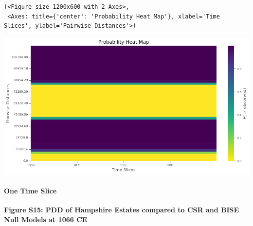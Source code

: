 \documentclass[
  11pt,
  letterpaper,
  DIV=11,
  numbers=noendperiod]{scrartcl}
\let\oldparagraph\paragraph
\renewcommand{\paragraph}[1]{\oldparagraph{#1}\mbox{}}
\begin{document}
\begin{verbatim}
(<Figure size 1200x600 with 2 Axes>,
 <Axes: title={'center': 'Probability Heat Map'}, xlabel='Time Slices', ylabel='Pairwise Distances'>)
\end{verbatim}

\includegraphics{analysis_files/figure-pdf/cell-29-output-2.png}

\paragraph{One Time Slice}\label{one-time-slice-1}

\paragraph{Figure S15: PDD of Hampshire Estates compared to CSR and BISE
Null Models at 1066
CE}\label{figure-s15-pdd-of-hampshire-estates-compared-to-csr-and-bise-null-models-at-1066-ce}
\end{document}
